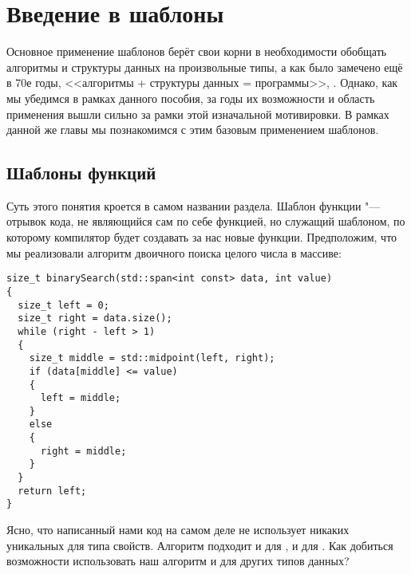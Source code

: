 \chapter{Введение в шаблоны}
Основное применение шаблонов берёт свои корни в необходимости обобщать алгоритмы и структуры данных на произвольные типы, а как было замечено ещё в 70е годы, <<алгоритмы + структуры данных = программы>>, \cite{Wirth1976}.
Однако, как мы убедимся в рамках данного пособия, за годы их возможности и область применения вышли сильно за рамки этой изначальной мотивировки.
В рамках данной же главы мы познакомимся с этим базовым применением шаблонов.

\section{Шаблоны функций}
Суть этого понятия кроется в самом названии раздела.
Шаблон функции "--- отрывок кода, не являющийся сам по себе функцией, но служащий шаблоном, по которому компилятор будет создавать за нас новые функции.
Предположим, что мы реализовали алгоритм двоичного поиска целого числа в массиве:
\begin{verbatim}
size_t binarySearch(std::span<int const> data, int value)
{
  size_t left = 0;
  size_t right = data.size();
  while (right - left > 1)
  {
    size_t middle = std::midpoint(left, right);
    if (data[middle] <= value)
    {
      left = middle;
    }
    else
    {
      right = middle;
    }
  }
  return left;
}
\end{verbatim}
Ясно, что написанный нами код на самом деле не использует никаких уникальных для типа  свойств.
Алгоритм подходит и для , и для .
Как добиться возможности использовать наш алгоритм и для других типов данных?

